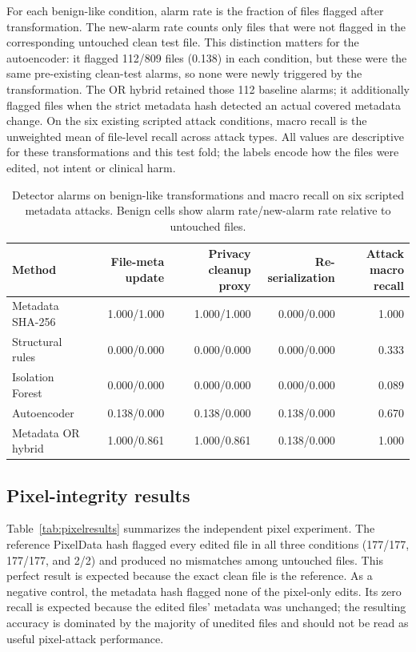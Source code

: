 \documentclass[journal]{IEEEtran}
\begin{document}
  For each benign-like condition, alarm rate is the fraction of files flagged after transformation. The new-alarm rate counts only files that were not flagged in the corresponding untouched clean test file. This distinction matters for the autoencoder: it flagged 112/809 files (0.138) in each condition, but these were the same pre-existing clean-test alarms, so none were newly triggered by the transformation. The OR hybrid retained those 112 baseline alarms; it additionally flagged files when the strict metadata hash detected an actual covered metadata change. On the six existing scripted attack conditions, macro recall is the unweighted mean of file-level recall across attack types. All values are descriptive for these transformations and this test fold; the labels encode how the files were edited, not intent or clinical harm.
  
  \begin{table}[t]
  \caption{Detector alarms on benign-like transformations and macro recall on six scripted metadata attacks. Benign cells show alarm rate/new-alarm rate relative to untouched files.}
  \label{tab:benign}
  \centering\scriptsize
  \setlength{\tabcolsep}{5pt}
  \begin{tabular}{lrrrr}
  \toprule
  Method & File-meta update & Privacy cleanup proxy & Re-serialization & Attack macro recall \\
  \midrule
  Metadata SHA-256 & 1.000/1.000 & 1.000/1.000 & 0.000/0.000 & 1.000 \\
  Structural rules & 0.000/0.000 & 0.000/0.000 & 0.000/0.000 & 0.333 \\
  Isolation Forest & 0.000/0.000 & 0.000/0.000 & 0.000/0.000 & 0.089 \\
  Autoencoder & 0.138/0.000 & 0.138/0.000 & 0.138/0.000 & 0.670 \\
  Metadata OR hybrid & 1.000/0.861 & 1.000/0.861 & 0.138/0.000 & 1.000 \\
  \bottomrule
  \end{tabular}
  \end{table}
  
  \subsection{Pixel-integrity results}
  Table~\ref{tab:pixelresults} summarizes the independent pixel experiment. The reference PixelData hash flagged every edited file in all three conditions (177/177, 177/177, and 2/2) and produced no mismatches among untouched files. This perfect result is expected because the exact clean file is the reference. As a negative control, the metadata hash flagged none of the pixel-only edits. Its zero recall is expected because the edited files' metadata was unchanged; the resulting accuracy is dominated by the majority of unedited files and should not be read as useful pixel-attack performance.
  
\end{document}
